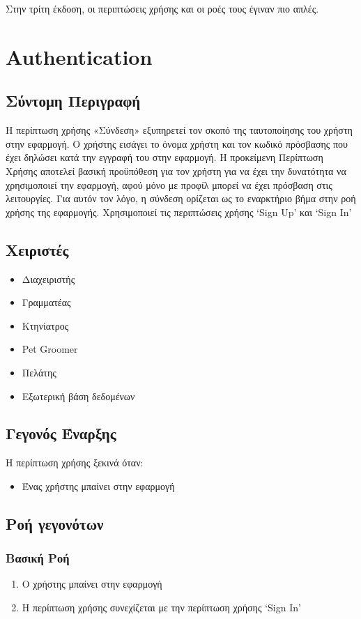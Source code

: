 \documentclass[12pt,a4paper,twoside]{book}
\begin{document}
Στην τρίτη έκδοση, οι περιπτώσεις χρήσης και οι ροές τους έγιναν πιο απλές. %

\section{Authentication}

\subsection{Σύντομη Περιγραφή}
Η περίπτωση χρήσης «Σύνδεση» εξυπηρετεί τον σκοπό της ταυτοποίησης του χρήστη στην εφαρμογή. Ο χρήστης εισάγει το όνομα χρήστη και τον κωδικό πρόσβασης που έχει δηλώσει κατά την εγγραφή του στην εφαρμογή. Η προκείμενη Περίπτωση Χρήσης αποτελεί βασική προϋπόθεση για τον χρήστη για να έχει την δυνατότητα να χρησιμοποιεί την εφαρμογή, αφού μόνο με προφίλ μπορεί να έχει πρόσβαση στις λειτουργίες. Για αυτόν τον λόγο, η σύνδεση ορίζεται ως το εναρκτήριο βήμα στην ροή χρήσης της εφαρμογής. Χρησιμοποιεί τις περιπτώσεις χρήσης `Sign Up' και `Sign In' %

\subsection{Χειριστές}
\begin{itemize}
  \item Διαχειριστής
  \item Γραμματέας
  \item Κτηνίατρος
  \item Pet Groomer
  \item Πελάτης
  \item Εξωτερική βάση δεδομένων %
\end{itemize}

\subsection{Γεγονός Έναρξης}
Η περίπτωση χρήσης ξεκινά όταν:
\begin{itemize}
  \item Ένας χρήστης μπαίνει στην εφαρμογή
\end{itemize}

\subsection{Ροή γεγονότων}

\subsubsection{Βασική Ροή}
\begin{enumerate}
  \item Ο χρήστης μπαίνει στην εφαρμογή
  \item Η περίπτωση χρήσης συνεχίζεται με την περίπτωση χρήσης `Sign In' %
\end{enumerate}
\end{document}
